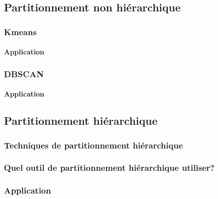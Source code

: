 \documentclass[]{book}
\let\oldparagraph\paragraph
\renewcommand{\paragraph}[1]{\oldparagraph{#1}\mbox{}}
\begin{document}
\hypertarget{partitionnement-non-hiuxe9rarchique}{%
\subsection{Partitionnement non
hiérarchique}\label{partitionnement-non-hiuxe9rarchique}}

\hypertarget{kmeans}{%
\subsubsection{Kmeans}\label{kmeans}}

\hypertarget{application}{%
\paragraph{Application}\label{application}}

\hypertarget{dbscan}{%
\subsubsection{DBSCAN}\label{dbscan}}

\hypertarget{application-1}{%
\paragraph{Application}\label{application-1}}

\hypertarget{partitionnement-hiuxe9rarchique}{%
\subsection{Partitionnement
hiérarchique}\label{partitionnement-hiuxe9rarchique}}

\hypertarget{techniques-de-partitionnement-hiuxe9rarchique}{%
\subsubsection{Techniques de partitionnement
hiérarchique}\label{techniques-de-partitionnement-hiuxe9rarchique}}

\hypertarget{quel-outil-de-partitionnement-hiuxe9rarchique-utiliser}{%
\subsubsection{Quel outil de partitionnement hiérarchique
utiliser?}\label{quel-outil-de-partitionnement-hiuxe9rarchique-utiliser}}

\hypertarget{application-2}{%
\subsubsection{Application}\label{application-2}}
\end{document}

